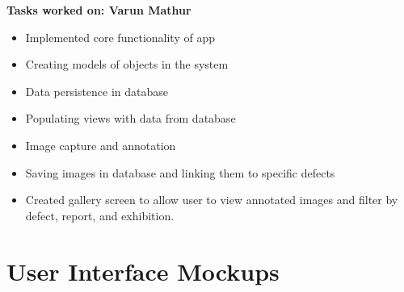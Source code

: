 \documentclass[12pt]{article}
\begin{document}
\textbf{ Tasks worked on: Varun Mathur}
\begin{itemize}
\item Implemented core functionality of app
\item Creating models of objects in the system
\item Data persistence in database
\item Populating views with data from database
\item Image capture and annotation
\item Saving images in database and linking them to specific defects
\item Created gallery screen to allow user to view annotated images and filter by defect, report, and exhibition.
\end{itemize}

\section{User Interface Mockups}
\end{document}
